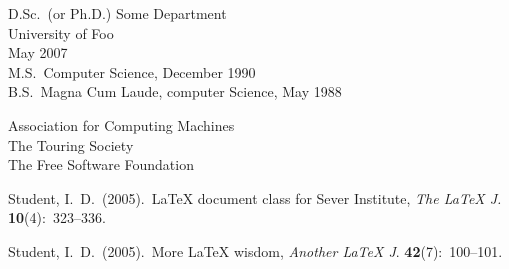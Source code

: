 %
%
%
\begin{center}
{\large\thesisauthor}
\end{center}
%
%
\newcommand{\vitalabel}[1]%
  {\raisebox{0pt}[1ex][0pt]
    {\makebox[\labelwidth][l]%
      {\parbox[t]{\labelwidth}{\hspace{0pt}\textbf{#1}}}}}
%
%
\begin{list}
  {}%
  { \renewcommand{\makelabel}{\vitalabel}%
    \setlength{\labelwidth}{100pt}%
    \setlength{\leftmargin}{120pt}%
    \setlength{\itemindent}{0pt}%
    \setlength{\parsep}{\baselineskip}%
    \setlength{\itemsep}{5pt}%
    }

\item[Degrees] 
	D.Sc.\ (or Ph.D.) Some Department \\University of Foo\\May 2007 \\
	M.S.\ Computer Science, December 1990 \\
B.S.\ Magna Cum Laude, computer Science, May 1988
\item[Professional\linebreak Societies]
  Association for Computing Machines \\
  The Touring Society \\
  The Free Software Foundation
\item[Publications]
  Student, I.\ D.\ (2005).\ \LaTeX{} document class for Sever Institute,
  \textit{The \LaTeX{} J.} \textbf{10}(4):~323--336.
  
  Student, I.\ D.\ (2005).\ More \LaTeX{} wisdom, \textit{Another \LaTeX{} J}.
  \textbf{42}(7):~100--101.
\end{list}
\flushright
\thesismonth\ \thesisyear

